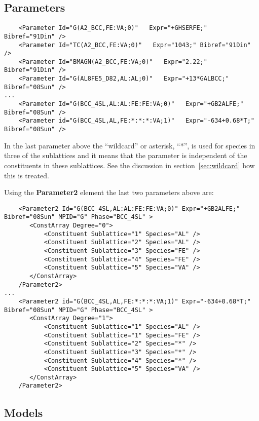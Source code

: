 \documentclass{article}
\begin{document}
\begin{appendices}
{\begin{verbatim}
\end{verbatim}
}


\subsection{Parameters}\label{sec:parameter examples}

{\small
\begin{verbatim}
    <Parameter Id="G(A2_BCC,FE:VA;0)"   Expr="+GHSERFE;" Bibref="91Din" />
    <Parameter Id="TC(A2_BCC,FE:VA;0)"   Expr="1043;" Bibref="91Din" />
    <Parameter Id="BMAGN(A2_BCC,FE:VA;0)"   Expr="2.22;" Bibref="91Din" />
    <Parameter Id="G(AL8FE5_D82,AL:AL;0)"   Expr="+13*GALBCC;" Bibref="08Sun" />
...
    <Parameter Id="G(BCC_4SL,AL:AL:FE:FE:VA;0)"   Expr="+GB2ALFE;" Bibref="08Sun" />
    <Parameter id="G(BCC_4SL,AL,FE:*:*:*:VA;1)"   Expr="-634+0.68*T;" Bibref="08Sun" />
\end{verbatim}
}

In the last parameter above the ``wildcard'' or asterisk, ``*'', is
used for species in three of the sublattices and it means that the
parameter is independent of the constituents in these sublattices.
See the discussion in section~\ref{sec:wildcard} how this is treated.

Using the {\bf Parameter2} element the last two parameters above are:

{\small
\begin{verbatim}
    <Parameter2 Id="G(BCC_4SL,AL:AL:FE:FE:VA;0)" Expr="+GB2ALFE;" Bibref="08Sun" MPID="G" Phase="BCC_4SL" >
       <ConstArray Degree="0">
           <Constituent Sublattice="1" Species="AL" />
           <Constituent Sublattice="2" Species="AL" />
           <Constituent Sublattice="3" Species="FE" />
           <Constituent Sublattice="4" Species="FE" />
           <Constituent Sublattice="5" Species="VA" />
       </ConstArray>
    /Parameter2>
...
    <Parameter2 id="G(BCC_4SL,AL,FE:*:*:*:VA;1)" Expr="-634+0.68*T;" Bibref="08Sun" MPID="G" Phase="BCC_4SL" >
       <ConstArray Degree="1">
           <Constituent Sublattice="1" Species="AL" />
           <Constituent Sublattice="1" Species="FE" />
           <Constituent Sublattice="2" Species="*" />
           <Constituent Sublattice="3" Species="*" />
           <Constituent Sublattice="4" Species="*" />
           <Constituent Sublattice="5" Species="VA" />
       </ConstArray>
    /Parameter2>
\end{verbatim}
}

\subsection{Models}\label{sec:modelex}


\end{appendices}
\end{document}
